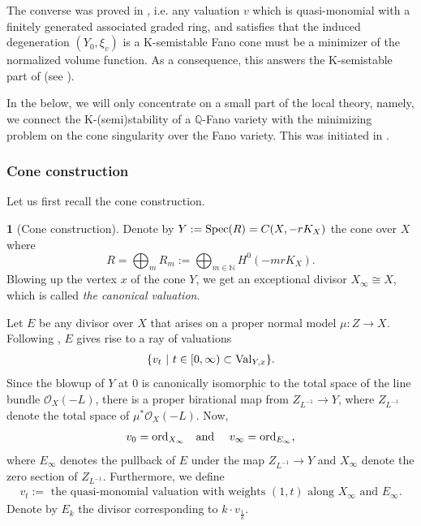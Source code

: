 \documentclass[12pt,reqno]{amsart}%
\newcommand{\bN}{{\mathbb{N} }}
\newcommand{\ord}{{\rm ord}}
\theoremstyle{definition}
\newtheorem{say}[thm]{}
\theoremstyle{remark}
\newcommand{\Val}{{\rm Val}}
\newcommand{\cO}{{\mathcal{O}}}
\newcommand{\bQ}{{\mathbb{Q}}}
\newcommand{\Spec}{{\rm Spec}}
\begin{document}
\begin{subappendices}
 The converse was proved in \cite{Li17, LX20, LX18}, i.e. any valuation $v$ which is quasi-monomial with a finitely generated associated graded ring, and satisfies that the induced degeneration $(Y_0, \xi_v)$ is a K-semistable Fano cone must be a minimizer of the normalized volume function. 
  As a consequence, this answers the K-semistable part of \cite[Conjecture 3.22]{DS17} (see \cite{LX18}). 

In the below, we will only concentrate on a small part of the local theory, namely, we connect the K-(semi)stability of a $\bQ$-Fano variety with the minimizing problem on the cone singularity over the Fano variety. This was initiated in \cite{Li17}. 

\subsubsection{Cone construction}\label{ss-cone}

Let us first recall the cone construction. 
\begin{say}[Cone construction]\label{say-cone}
Denote by $Y:=\Spec (R)=C(X,-rK_X)$ the cone over $X$ where 
$$R=\bigoplus_m R_m:=\bigoplus_{m\in \bN} H^0(-mrK_X).$$
 Blowing up the vertex $x$ of the cone $Y$, we get an exceptional divisor $X_{\infty}\cong X$, which is called {\it the canonical valuation}.


Let $E$ be any divisor over $X$ that arises on a proper normal model $\mu:Z\to X$. Following  \cite{Li17,LX20}, $E$ gives rise to a ray of valuations 
\begin{eqnarray}\label{e-ray}
\{v_{t}\ |\  t\in [0,\infty) \subset \Val_{Y,x}\}.
\end{eqnarray}
  Since the blowup of $Y$ at $0$ is canonically isomorphic to the total space of the line bundle $\cO_X(-L)$, there is a proper birational map from 
 $Z_{L^{-1}} \to Y$, where $Z_{L^{-1}}$ denote the total space of $\mu^*\cO_X(-L)$. 
   Now, $$v_0=\ord_{X_{\infty}}\mbox{\ \ \   and  \ \ \ }v_{\infty}=\ord_{E_{\infty}},$$
  where  $E_{\infty}$ denotes the pullback of $E$ under the map 
  $Z_{L^{-1}} \to Y$ and $X_{\infty}$ denote the zero section of $Z_{L^{-1}}$. 
  Furthermore, we define
  \begin{eqnarray}\label{e-rayvaluation}
  v_t:=  \mbox{ the quasi-monomial valuation with weights $(1,t)$ along $X_\infty$ and $E_{\infty}$.}
  \end{eqnarray}
  Denote by $E_k$ the divisor corresponding to $k\cdot v_{\frac{1}{k}}$.
  \end{say}


\end{subappendices}
\end{document}
